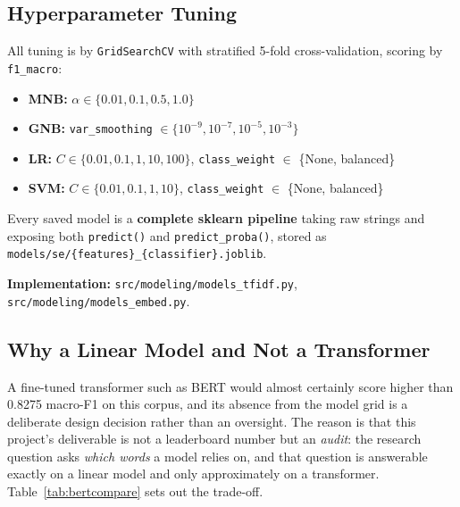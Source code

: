 \documentclass[11pt,a4paper]{article}
\begin{document}
\subsection{Hyperparameter Tuning}

All tuning is by \texttt{GridSearchCV} with stratified 5-fold cross-validation, scoring by \texttt{f1\_macro}:

\begin{itemize}[leftmargin=*]
    \item \textbf{MNB:} $\alpha \in \{0.01, 0.1, 0.5, 1.0\}$
    \item \textbf{GNB:} \texttt{var\_smoothing} $\in \{10^{-9}, 10^{-7}, 10^{-5}, 10^{-3}\}$
    \item \textbf{LR:} $C \in \{0.01, 0.1, 1, 10, 100\}$, \texttt{class\_weight} $\in$ \{None, balanced\}
    \item \textbf{SVM:} $C \in \{0.01, 0.1, 1, 10\}$, \texttt{class\_weight} $\in$ \{None, balanced\}
\end{itemize}

Every saved model is a \textbf{complete sklearn pipeline} taking raw strings and exposing both \texttt{predict()} and \texttt{predict\_proba()}, stored as \texttt{models/se/\{features\}\_\{classifier\}.joblib}.

\textbf{Implementation:} \texttt{src/modeling/models\_tfidf.py}, \texttt{src/modeling/models\_embed.py}.

\subsection{Why a Linear Model and Not a Transformer}
\label{sec:whynotbert}

A fine-tuned transformer such as BERT would almost certainly score higher than
0.8275 macro-F1 on this corpus, and its absence from the model grid is a
deliberate design decision rather than an oversight. The reason is that this
project's deliverable is not a leaderboard number but an \textit{audit}: the
research question asks \textit{which words} a model relies on, and that
question is answerable exactly on a linear model and only approximately on a
transformer. Table~\ref{tab:bertcompare} sets out the trade-off.
\end{document}
